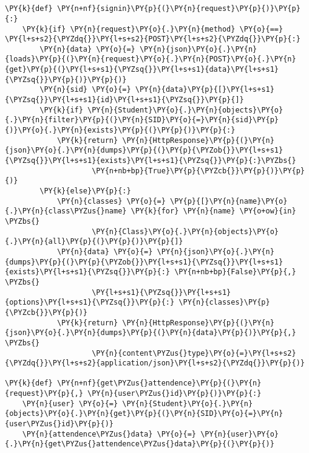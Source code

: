 \section*{}

\begin{Verbatim}[commandchars=\\\{\}]
\PY{k}{def} \PY{n+nf}{signin}\PY{p}{(}\PY{n}{request}\PY{p}{)}\PY{p}{:}
    \PY{k}{if} \PY{n}{request}\PY{o}{.}\PY{n}{method} \PY{o}{==} \PY{l+s+s2}{\PYZdq{}}\PY{l+s+s2}{POST}\PY{l+s+s2}{\PYZdq{}}\PY{p}{:}
        \PY{n}{data} \PY{o}{=} \PY{n}{json}\PY{o}{.}\PY{n}{loads}\PY{p}{(}\PY{n}{request}\PY{o}{.}\PY{n}{POST}\PY{o}{.}\PY{n}{get}\PY{p}{(}\PY{l+s+s1}{\PYZsq{}}\PY{l+s+s1}{data}\PY{l+s+s1}{\PYZsq{}}\PY{p}{)}\PY{p}{)}
        \PY{n}{sid} \PY{o}{=} \PY{n}{data}\PY{p}{[}\PY{l+s+s1}{\PYZsq{}}\PY{l+s+s1}{id}\PY{l+s+s1}{\PYZsq{}}\PY{p}{]}
        \PY{k}{if} \PY{n}{Student}\PY{o}{.}\PY{n}{objects}\PY{o}{.}\PY{n}{filter}\PY{p}{(}\PY{n}{SID}\PY{o}{=}\PY{n}{sid}\PY{p}{)}\PY{o}{.}\PY{n}{exists}\PY{p}{(}\PY{p}{)}\PY{p}{:}
            \PY{k}{return} \PY{n}{HttpResponse}\PY{p}{(}\PY{n}{json}\PY{o}{.}\PY{n}{dumps}\PY{p}{(}\PY{p}{\PYZob{}}\PY{l+s+s1}{\PYZsq{}}\PY{l+s+s1}{exists}\PY{l+s+s1}{\PYZsq{}}\PY{p}{:}\PYZbs{}
                    \PY{n+nb+bp}{True}\PY{p}{\PYZcb{}}\PY{p}{)}\PY{p}{)}
        \PY{k}{else}\PY{p}{:}
            \PY{n}{classes} \PY{o}{=} \PY{p}{[}\PY{n}{name}\PY{o}{.}\PY{n}{class\PYZus{}name} \PY{k}{for} \PY{n}{name} \PY{o+ow}{in} \PYZbs{}
                    \PY{n}{Class}\PY{o}{.}\PY{n}{objects}\PY{o}{.}\PY{n}{all}\PY{p}{(}\PY{p}{)}\PY{p}{]}
            \PY{n}{data} \PY{o}{=} \PY{n}{json}\PY{o}{.}\PY{n}{dumps}\PY{p}{(}\PY{p}{\PYZob{}}\PY{l+s+s1}{\PYZsq{}}\PY{l+s+s1}{exists}\PY{l+s+s1}{\PYZsq{}}\PY{p}{:} \PY{n+nb+bp}{False}\PY{p}{,} \PYZbs{}
                    \PY{l+s+s1}{\PYZsq{}}\PY{l+s+s1}{options}\PY{l+s+s1}{\PYZsq{}}\PY{p}{:} \PY{n}{classes}\PY{p}{\PYZcb{}}\PY{p}{)}
            \PY{k}{return} \PY{n}{HttpResponse}\PY{p}{(}\PY{n}{json}\PY{o}{.}\PY{n}{dumps}\PY{p}{(}\PY{n}{data}\PY{p}{)}\PY{p}{,} \PYZbs{}
                    \PY{n}{content\PYZus{}type}\PY{o}{=}\PY{l+s+s2}{\PYZdq{}}\PY{l+s+s2}{application/json}\PY{l+s+s2}{\PYZdq{}}\PY{p}{)}

\PY{k}{def} \PY{n+nf}{get\PYZus{}attendence}\PY{p}{(}\PY{n}{request}\PY{p}{,} \PY{n}{user\PYZus{}id}\PY{p}{)}\PY{p}{:}
    \PY{n}{user} \PY{o}{=} \PY{n}{Student}\PY{o}{.}\PY{n}{objects}\PY{o}{.}\PY{n}{get}\PY{p}{(}\PY{n}{SID}\PY{o}{=}\PY{n}{user\PYZus{}id}\PY{p}{)}
    \PY{n}{attendence\PYZus{}data} \PY{o}{=} \PY{n}{user}\PY{o}{.}\PY{n}{get\PYZus{}attendence\PYZus{}data}\PY{p}{(}\PY{p}{)}


\end{Verbatim}
